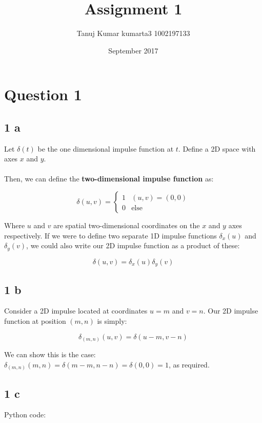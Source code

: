 \documentclass{article}
\title{Assignment 1}
\author{Tanuj Kumar kumarta3 1002197133}
\date{September 2017}
\begin{document}
\maketitle

\section{Question 1}

\subsection{1 a}
Let $\delta(t)$ be the one dimensional impulse function at $t$. Define a 2D space with axes $x$ and $y$. 
\\\\
\noindent
Then, we can define the \textbf{two-dimensional impulse function} as:

$$\delta(u,v) = 
\begin{cases}
1 & (u,v) = (0,0) \\
0 & \text{else}
\end{cases}$$

\noindent
Where $u$ and $v$ are spatial two-dimensional coordinates on the $x$ and $y$ axes respectively. If we were to define two separate 1D impulse functions $\delta_{x}(u)$ and $\delta_{y}(v)$, we could also write our 2D impulse function as a product of these:

$$\delta(u,v) = \delta_{x}(u)\delta_{y}(v)$$

\subsection{1 b}

Consider a 2D impulse located at coordinates $u = m$ and $v = n$. Our 2D impulse function at position $(m,n)$ is simply:

$$\delta_{(m,n)}(u,v) = \delta(u - m, v - n)$$

\noindent
We can show this is the case: $\delta_{(m,n)}(m,n) = \delta(m-m,n-n) = \delta(0,0) = 1$, as required.

\subsection{1 c}

Python code:
\end{document}
